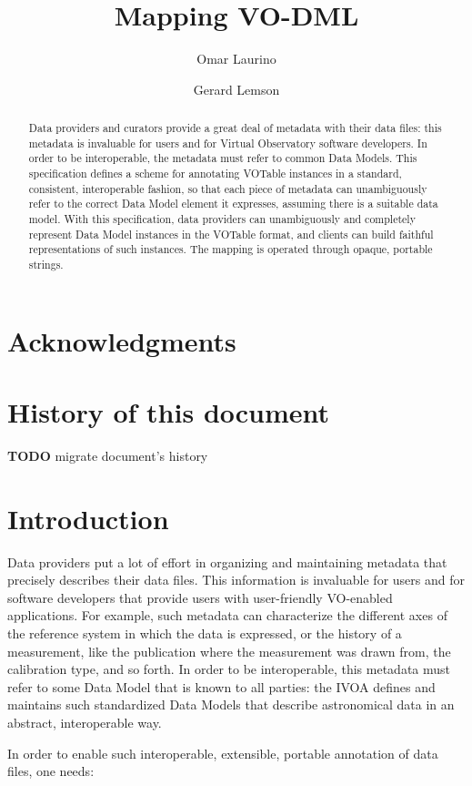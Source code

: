 \documentclass[11pt,a4paper]{ivoa}
\title{Mapping VO-DML}
\author{Omar Laurino}
\author{Gerard Lemson}
\begin{document}
\begin{abstract}
Data providers and curators provide a great deal of metadata with their
data ﬁles: this metadata is invaluable for users and for Virtual Observatory
software developers. In order to be interoperable, the metadata must refer
to common Data Models. This speciﬁcation deﬁnes a scheme for annotating
VOTable instances in a standard, consistent, interoperable fashion, so that
each piece of metadata can unambiguously refer to the correct Data Model
element it expresses, assuming there is a suitable data model. With this
speciﬁcation, data providers can unambiguously and completely represent
Data Model instances in the VOTable format, and clients can build faithful
representations of such instances. The mapping is operated through opaque,
portable strings.
\end{abstract}


\section*{Acknowledgments}

\section*{History of this document}\label{history-of-this-document}

\textbf{TODO} migrate document's history

\section{Introduction}\label{introduction}

Data providers put a lot of effort in organizing and maintaining
metadata that precisely describes their data files. This information is
invaluable for users and for software developers that provide users with
user-friendly VO-enabled applications. For example, such metadata can
characterize the different axes of the reference system in which the
data is expressed, or the history of a measurement, like the publication
where the measurement was drawn from, the calibration type, and so
forth. In order to be interoperable, this metadata must refer to some
Data Model that is known to all parties: the IVOA defines and maintains
such standardized Data Models that describe astronomical data in an
abstract, interoperable way.

In order to enable such interoperable, extensible, portable annotation
of data files, one needs:
\end{document}
